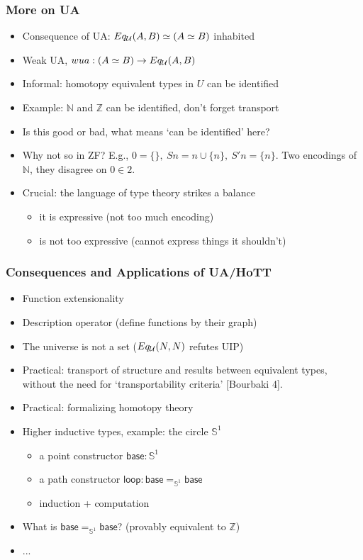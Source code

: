 \documentclass[handout]{beamer}
\newcommand{\Nat}{\mathbb{N}}
\newcommand{\Int}{\mathbb{Z}}
\newcommand{\set}[1]{\{#1\}}
\newcommand{\UU}{{\cal U}}
\newcommand{\Sn}{\mathbb{S}}
\newcommand{\base}{\mathsf{base}}
\newcommand{\lloop}{\mathsf{loop}}
\begin{document}
\begin{frame}
\frametitle{More on UA}
  \begin{itemize}[<+->]
    \item Consequence of UA: $Eq_{\UU}(A,B) \simeq (A\simeq B)$ inhabited
    \item Weak UA, $wua : (A\simeq B) \to Eq_{\UU}(A,B)$
    \item Informal: homotopy equivalent types in $U$ can be identified
    \item Example: $\Nat$ and $\Int$ can be identified, don't forget transport
    \item Is this good or bad, what means `can be identified' here?
    \item Why not so in ZF? E.g., $0=\set{},~Sn = n \cup \set{n},~S'n=\set{n}$.
    Two encodings of $\Nat$, they disagree on $0\in 2$.
    \item Crucial: the language of type theory strikes a balance
      \begin{itemize}[<+->]
      \item it is expressive (not too much encoding)
      \item is not too expressive (cannot express things it shouldn't)
      \end{itemize}
  \end{itemize}
\end{frame}


 \frame
  {
  
    \frametitle{Consequences and Applications of UA/HoTT}

    \begin{itemize}[<+->]
    \item Function extensionality
    \item Description operator (define functions by their graph)
    \item The universe is not a set ($Eq_\UU(N,N)$ refutes UIP)
     \item Practical: transport of structure and results between equivalent types,
    without the need for `transportability criteria' [Bourbaki 4].
    \href{https://en.wikipedia.org/wiki/Equivalent_definitions_of_mathematical_structures}%
    {\color{red}{wiki/Equivalent\_definitions\_of\_mathematical\_structures}}
   \item Practical: formalizing homotopy theory \color{red}{synthetically}
    \item Higher inductive types, example: the circle $\Sn^1$
\begin{itemize}
\item a point constructor $\base :\Sn^1$
\item a path constructor $\lloop : {\base =_{\Sn^1} \base}$
\item induction + computation
\end{itemize}
    \item What is  $\base =_{\Sn^1} \base$? (provably equivalent to $\Int$)     
    \item ...
    
    \end{itemize}
  }
 
\end{document}

